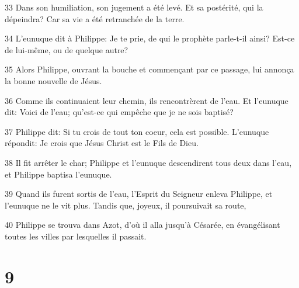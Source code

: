 \par 33 Dans son humiliation, son jugement a été levé. Et sa postérité, qui la dépeindra? Car sa vie a été retranchée de la terre.
\par 34 L'eunuque dit à Philippe: Je te prie, de qui le prophète parle-t-il ainsi? Est-ce de lui-même, ou de quelque autre?
\par 35 Alors Philippe, ouvrant la bouche et commençant par ce passage, lui annonça la bonne nouvelle de Jésus.
\par 36 Comme ils continuaient leur chemin, ils rencontrèrent de l'eau. Et l'eunuque dit: Voici de l'eau; qu'est-ce qui empêche que je ne sois baptisé?
\par 37 Philippe dit: Si tu crois de tout ton coeur, cela est possible. L'eunuque répondit: Je crois que Jésus Christ est le Fils de Dieu.
\par 38 Il fit arrêter le char; Philippe et l'eunuque descendirent tous deux dans l'eau, et Philippe baptisa l'eunuque.
\par 39 Quand ils furent sortis de l'eau, l'Esprit du Seigneur enleva Philippe, et l'eunuque ne le vit plus. Tandis que, joyeux, il poursuivait sa route,
\par 40 Philippe se trouva dans Azot, d'où il alla jusqu'à Césarée, en évangélisant toutes les villes par lesquelles il passait.

\chapter{9}

